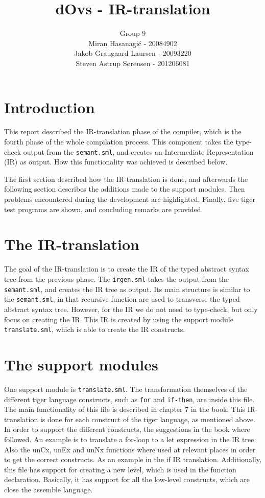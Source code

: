 \documentclass{article}
\title{dOvs - IR-translation}
\author{
  Group 9 \\
  Miran Hasanagi\'{c} - 20084902 \\
  Jakob Graugaard Laursen - 20093220\\
  Steven Astrup S\o rensen - 201206081
}
\begin{document}
\maketitle

\section{Introduction}
This report described the IR-translation phase of the compiler, which is the fourth phase of the whole compilation process. This component takes the type-check output from the \texttt{semant.sml}, and creates an Intermediate Representation (IR) as output. How this functionality was achieved is described below.

The first section described how the IR-translation is done, and afterwards the following section describes the additions made to the support modules. Then problems encountered during the development are highlighted. Finally, five tiger test programs are shown, and concluding remarks are provided.

\section{The IR-translation}

The goal of the IR-translation is to create the IR of the typed abstract syntax tree from the previous phase. The \texttt{irgen.sml} takes the output from the \texttt{semant.sml}, and creates the IR tree as output. Its main structure is similar to the \texttt{semant.sml}, in that recursive function are used to transverse the typed abstract syntax tree. However, for the IR we do not need to type-check, but only focus on creating the IR. This IR is created by using the support module \texttt{translate.sml}, which is able to create the IR constructs.

\section{The support modules}

One support module is \texttt{translate.sml}. The transformation themselves of the different tiger language constructs, such as \texttt{for} and \texttt{if-then}, are inside this file. 
The main functionality of this file is described in chapter 7 in the book. This IR-translation is done for each construct of the tiger language, as mentioned above. In order to support the different constructs, the suggestions in the book where followed. An example is to translate a for-loop to a let expression in the IR tree. 
Also the unCx, unEx and unNx functions where used at relevant places in order to get the correct constructs. As an example in the if IR translation. 
Additionally, this file has support for creating a new level, which is used in the function declaration. Basically, it has support for all the low-level constructs, which are close the assemble language. 
\end{document}

